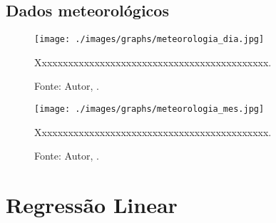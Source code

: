 \section{Dados meteorológicos}





\begin{figure}[H]
    \centering
    \texttt{[image: ./images/graphs/meteorologia\_dia.jpg]}
    \caption{Xxxxxxxxxxxxxxxxxxxxxxxxxxxxxxxxxxxxxxxxxxxx.}
    \label{fig:meteorologia_dia.jpg}
    \caption*{Fonte: Autor, \imprimirdata.}
\end{figure}




\begin{figure}[H]
    \centering
    \texttt{[image: ./images/graphs/meteorologia\_mes.jpg]}
    \caption{Xxxxxxxxxxxxxxxxxxxxxxxxxxxxxxxxxxxxxxxxxxxx.}
    \label{fig:meteorologia_mes.jpg}
    \caption*{Fonte: Autor, \imprimirdata.}
\end{figure}





\chapter{Regressão Linear}




